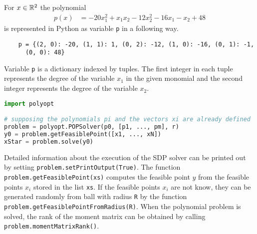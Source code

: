 \begin{example}
  For $x\in\mathbb{R}^2$ the polynomial
  \begin{align}
    p(x) &= -20x_1^2 + x_1x_2 -12x_2^2 -16x_1 -x_2 +48
  \end{align}
  is represented in Python as variable \texttt{p} in a following way.
\begin{verbatim}
    p = {(2, 0): -20, (1, 1): 1, (0, 2): -12, (1, 0): -16, (0, 1): -1,
      (0, 0): 48}
\end{verbatim}
  Variable \texttt{p} is a dictionary indexed by tuples.
  The first integer in each tuple represents the degree of the variable $x_1$ in the given monomial and the second integer represents the degree of the variable $x_2$.
\end{example}

\begin{lstlisting}[language=python, caption={Typical usage of the class \texttt{POPSolver} of the Polyopt package.}, labellis={POP:opt:usage}]
import polyopt

# supposing the polynomials pi and the vectors xi are already defined
problem = polyopt.POPSolver(p0, [p1, ..., pm], r)
y0 = problem.getFeasiblePoint([x1, ..., xN])
xStar = problem.solve(y0)
\end{lstlisting}

Detailed information about the execution of the SDP solver can be printed out by setting \texttt{problem.setPrintOutput(True)}.
The function \texttt{problem.getFeasiblePoint(xs)} computes the feasible point $y$ from the feasible points $x_i$ stored in the list \texttt{xs}.
If the feasible points $x_i$ are not know, they can be generated randomly from ball with radius \texttt{R} by the function \texttt{problem.getFeasiblePointFromRadius(R)}.
When the polynomial problem is solved, the rank of the moment matrix can be obtained by calling \texttt{problem.momentMatrixRank()}.

